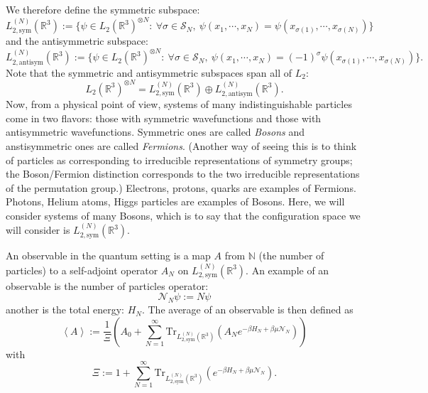 \documentclass{ian}
\begin{document}
\indent
We therefore define the symmetric subspace:
\begin{equation}
  L_{2,\mathrm{sym}}^{(N)}(\mathbb R^3)
  :=\{\psi\in L_2(\mathbb R^3)^{\otimes N}:\ 
  \forall \sigma\in\mathcal S_N,\ \psi(x_1,\cdots,x_N)=\psi(x_{\sigma(1)},\cdots,x_{\sigma(N)})
  \}
\end{equation}
and the antisymmetric subspace:
\begin{equation}
  L_{2,\mathrm{antisym}}^{(N)}(\mathbb R^3)
  :=\{\psi\in L_2(\mathbb R^3)^{\otimes N}:\ 
  \forall \sigma\in\mathcal S_N,\ \psi(x_1,\cdots,x_N)=(-1)^\sigma\psi(x_{\sigma(1)},\cdots,x_{\sigma(N)})
  \}
  .
\end{equation}
Note that the symmetric and antisymmetric subspaces span all of $L_2$:
\begin{equation}
  L_2(\mathbb R^3)^{\otimes N}
  =
  L_{2,\mathrm{sym}}^{(N)}(\mathbb R^3)
  \oplus
  L_{2,\mathrm{antisym}}^{(N)}(\mathbb R^3)
  .
\end{equation}
Now, from a physical point of view, systems of many indistinguishable particles come in two flavors: those with symmetric wavefunctions and those with antisymmetric wavefunctions.
Symmetric ones are called {\it Bosons} and anstisymmetric ones are called {\it Fermions}.
(Another way of seeing this is to think of particles as corresponding to irreducible representations of symmetry groups; the Boson/Fermion distinction corresponds to the two irreducible representations of the permutation group.)
Electrons, protons, quarks are examples of Fermions.
Photons, Helium atoms, Higgs particles are examples of Bosons.
Here, we will consider systems of many Bosons, which is to say that the configuration space we will consider is $L_{2,\mathrm{sym}}^{(N)}(\mathbb R^3)$.
\bigskip

\indent
An observable in the quantum setting is a map $A$ from $\mathbb N$ (the number of particles) to a self-adjoint operator $A_N$ on $L_{2,\mathrm{sym}}^{(N)}(\mathbb R^3)$.
An example of an observable is the number of particles operator:
\begin{equation}
  \mathcal N_N\psi:=N\psi
\end{equation}
another is the total energy: $H_N$.
The average of an observable is then defined as
\begin{equation}
  \left<A\right>
  :=\frac1\Xi
  \left(
    A_0+
    \sum_{N=1}^\infty
    \mathrm{Tr}_{L_{2,\mathrm{sym}}^{(N)}(\mathbb R^3)}(A_Ne^{-\beta H_N+\beta \mu\mathcal N_N})
  \right)
\end{equation}
with
\begin{equation}
  \Xi:=
  1+
  \sum_{N=1}^\infty
  \mathrm{Tr}_{L_{2,\mathrm{sym}}^{(N)}(\mathbb R^3)}(e^{-\beta H_N+\beta \mu\mathcal N_N})
  .
\end{equation}
\bigskip
\end{document}
